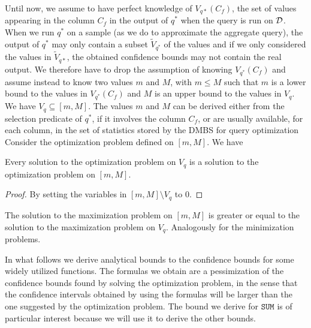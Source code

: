 Until now, we assume to have perfect knowledge of $V_{q*}(C_f)$, the set of
values appearing in the column $C_f$ in the output of $q^*$ when the query is
run on ${\cal D}$. When we run $q^*$ on a
sample (as we do to approximate the aggregate query), the output of $q^*$ may
only contain a subset $\tilde{V}_{q^*}$ of the values and if we only considered
the values in $\tilde{V}_{q*}$, the obtained confidence bounds may not contain the
real output. We therefore have to drop the assumption of knowing $V_{q^*}(C_f)$
and assume instead to know two values $m$ and $M$, with $m\le M$ such that $m$
is a lower bound to the values in $V_{q^*}(C_f)$ and $M$ is an upper bound to
the values in $V_q$. We have $V_q\subseteq[m,M]$. The values $m$ and $M$ can be
derived either from the selection predicate of $q^*$, if it involves the column
$C_f$, or are usually available, for each column, in the set of statistics
stored by the DMBS for query optimization
Consider the optimization problem defined on $[m,M]$.
We have

\begin{lemma}\label{lem:equivoptprobs}
  Every solution to the optimization problem on $V_q$ is a solution to the
  optimization problem on $[m,M]$.
\end{lemma}
\begin{proof}
  By setting the variables in $[m,M]\setminus V_q$ to $0$.
\end{proof}

\begin{corollary}
  The solution to the maximization problem on $[m,M]$ is greater or equal to the
  solution to the maximization problem on $V_q$. Analogously for the
  minimization problems.
\end{corollary}


In what follows we derive analytical bounds to the confidence bounds for some
widely utilized functions. The formulas we obtain are a pessimization of the
confidence bounds found by solving the optimization problem, in the sense that
the confidence intervals obtained by using the formulas will be larger than the
one suggested by the optimization problem. The bound we derive for
$\texttt{SUM}$ is of particular interest because we will use it to derive the
other bounds.

